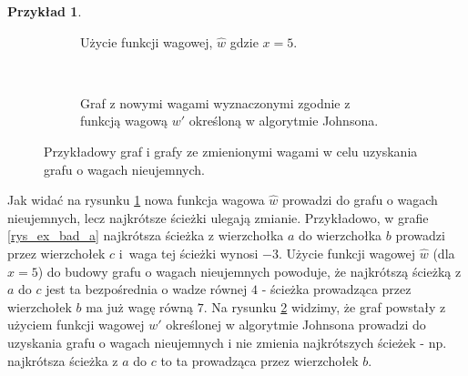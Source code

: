 \documentclass[12pt,a4paper]{book}
\theoremstyle{definition}
\newtheorem{ex}{Przykład}
\numberwithin{equation}{chapter}
\begin{document}
\begin{ex}
\begin{figure}[H]
\begin{subfigure}[b]{0.45\textwidth}
	\caption{Użycie funkcji wagowej, $\widehat{w}$ gdzie $x = 5$.}
	\label{rys_ex_bad_b}
\end{subfigure}
~
\begin{subfigure}[b]{0.45\textwidth}
        \centering
        \caption{Graf z nowymi wagami wyznaczonymi zgodnie z funkcją wagową  $w'$ określoną w algorytmie Johnsona.}
        \label{rys_ex_bad_c}

\end{subfigure}
\caption{Przykładowy graf i grafy ze zmienionymi wagami w celu uzyskania grafu o wagach nieujemnych.}
\label{rys_przeb_ex_bad}
\end{figure}

Jak widać na rysunku \ref{rys_ex_bad_b} nowa funkcja wagowa $\widehat{w}$ prowadzi do grafu o wagach nieujemnych, lecz najkrótsze ścieżki ulegają zmianie. Przykładowo, w grafie \ref{rys_ex_bad_a} najkrótsza ścieżka z wierzchołka $a$ do wierzchołka $b$  prowadzi przez wierzchołek $c$ i~waga tej ścieżki wynosi $-3$. Użycie funkcji wagowej $\widehat{w}$ (dla $x = 5$) do budowy grafu o wagach nieujemnych powoduje, że najkrótszą ścieżką z $a$ do $c$ jest ta bezpośrednia o wadze równej $4$ - ścieżka prowadząca przez wierzchołek $b$ ma już wagę równą $7$. Na rysunku \ref{rys_ex_bad_c} widzimy, że graf powstały z użyciem funkcji wagowej $w'$ określonej w algorytmie Johnsona prowadzi do uzyskania grafu o wagach nieujemnych i nie zmienia najkrótszych ścieżek - np. najkrótsza ścieżka z $a$ do $c$ to ta prowadząca przez wierzchołek $b$. 
\end{ex}
\end{document}
